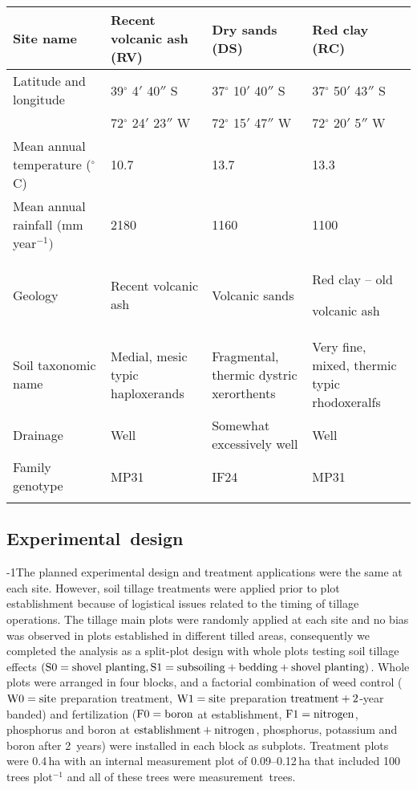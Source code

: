 \documentclass[final]{foresj}
\begin{document}
\begin{table*}[!t]
{\begin{tabular*}{\textwidth}{@{\extracolsep{\fill}}lP{10pc}P{10pc}P{10pc}@{}} \toprule Site name& Recent
volcanic ash (RV)& Dry sands (DS)&
Red clay (RC) \\
\midrule
Latitude and longitude& 39$^{\circ}$ 4$'$ 40$''$ S
& 37$^{\circ}$ 10$'$ 40$''$ S &
37$^{\circ}$ 50$' $ 43$''$ S  \\
&72$^{\circ}$ 24$'$ 23$''$ W&72$^{\circ}$ 15$' $ 47$''$ W&72$^{\circ}$ 20$' $ 5$''$ W\\
Mean annual temperature ($^{\circ}$C)& 10.7& 13.7&13.3 \\
Mean annual rainfall (mm year$^{-1})$& 2180& 1160&
1100 \\
Geology& Recent volcanic ash& Volcanic sands&
Red clay -- old\par volcanic ash \\
Soil taxonomic name& Medial, mesic typic haploxerands&
Fragmental, thermic dystric xerorthents&
Very fine, mixed, thermic typic rhodoxeralfs \\
Drainage& Well& Somewhat excessively well&
Well \\
Family genotype& MP31& IF24&
MP31 \\
\botrule
\end{tabular*}}{}
\vskip1.5pc
\end{table*}

\subsection{Experimental~design}

\looseness-1The planned experimental design and treatment applications
were the same at each site. However, soil tillage
treatments were applied prior to plot establishment because
of logistical issues related to the timing of tillage
operations. The tillage main plots were randomly applied at
each site and no bias was observed in plots established in
different tilled areas, consequently we completed the
analysis as a split-plot design with whole plots testing
soil tillage effects $(\hbox{S}0=\hbox{shovel planting},
\hbox{S}1=\hbox{subsoiling} + \hbox{bedding} + \hbox{shovel
planting})$. Whole plots were arranged in four blocks, and
a factorial combination of weed \nobreak control
($\hbox{W}0=\hbox{site}$ preparation treatment,
$\hbox{W}1=\hbox{site}$ preparation \hbox{$\hbox{treatment} +
2$-year} banded) and fertilization ($\hbox{F}0=\hbox{boron}$
at establishment, $\hbox{F}1= \hbox{nitrogen}$, phosphorus
and boron at $\hbox{establishment} + \hbox{nitrogen}$,
phosphorus, potassium and boron after 2~years) were
installed in each block as subplots. Treatment plots were
0.4\,ha with an internal measurement plot of 0.09--0.12\,ha
that included 100 trees plot$^{-1}$ and all of these trees
were measurement~trees.
\end{document}
